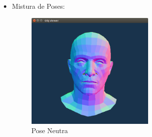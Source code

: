 \documentclass[brazil]{beamer}
\begin{document}
\begin{frame}
  \begin{itemize}
  \item Mistura de Poses:
  \begin{figure}
\centering
\includegraphics[width = 0.6\textwidth, keepaspectratio]{./img/rosto-neutro.png}
        \caption{Pose Neutra}
     \end{figure}         
  \end{itemize} 
\end{frame}
\end{document}
